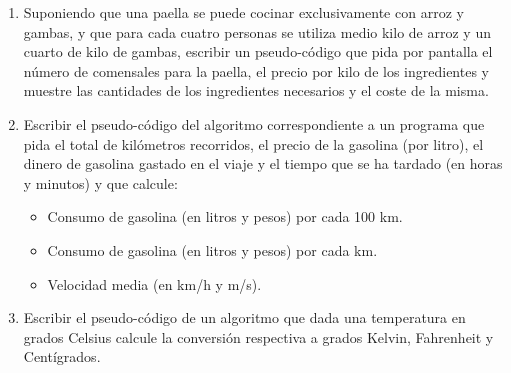 \documentclass[a4paper,10pt]{article}
\begin{document}
\begin{enumerate}



\item Suponiendo que una paella se puede cocinar exclusivamente con arroz y gambas, y que para cada cuatro personas se utiliza medio kilo de arroz y un cuarto de kilo de gambas, escribir un pseudo-c\'odigo que pida por pantalla el n\'umero de comensales para la paella, el precio por kilo de los ingredientes y muestre las cantidades de los ingredientes necesarios y el coste de la misma.

\item Escribir el pseudo-c\'odigo del algoritmo correspondiente a un programa que pida el total de kil\'ometros recorridos, el precio de la gasolina (por litro), el dinero de gasolina gastado en el viaje y el tiempo que se ha tardado (en horas y minutos) y que calcule:
    \begin{itemize}
        \item[a-] Consumo de gasolina (en litros y pesos) por cada 100 km.
        \item[b-] Consumo de gasolina (en litros y pesos) por cada km.
        \item[c-] Velocidad media (en km/h y m/s).
    \end{itemize}

\item Escribir el pseudo-c\'odigo de un algoritmo que dada una temperatura en grados Celsius calcule la conversi\'on respectiva a grados Kelvin, Fahrenheit y Cent\'igrados.


\end{enumerate}
\end{document}
